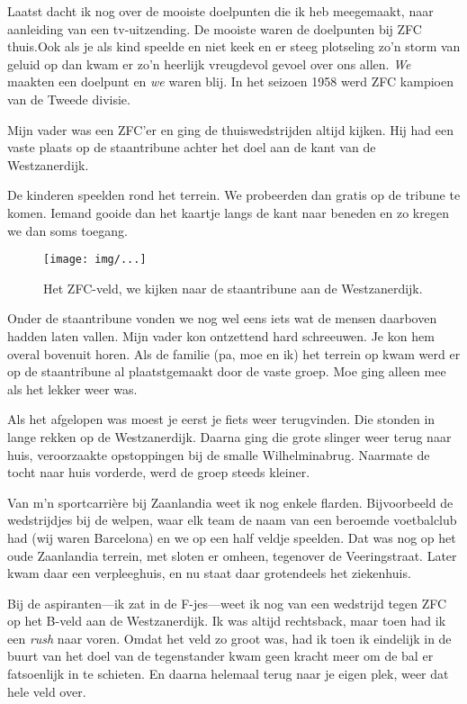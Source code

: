 \documentclass[10pt,twoside,openright]{memoir}
\begin{document}
Laatst dacht ik nog over de mooiste doelpunten die ik heb meegemaakt, naar aanleiding van een tv-uitzending. De mooiste waren de doelpunten bij ZFC thuis.Ook als je als kind speelde en niet keek en er steeg plotseling zo’n storm van geluid op dan kwam er zo’n heerlijk vreugdevol gevoel over ons allen. \emph{We} maakten een doelpunt en \emph{we} waren blij. In het seizoen 1958 werd ZFC kampioen van de Tweede divisie.

Mijn vader was een ZFC’er en ging de thuiswedstrijden altijd kijken. Hij had een vaste plaats op de staantribune achter het doel aan de kant van de Westzanerdijk. 

De kinderen speelden rond het terrein. We probeerden dan gratis op de tribune te komen. Iemand gooide dan het kaartje langs de kant naar beneden en zo kregen we dan soms toegang. 

\begin{figure}[t]
\texttt{[image: img/...]}
\caption{Het ZFC-veld, we kijken naar de staantribune aan de Westzanerdijk.}
\end{figure}

Onder de staantribune vonden we nog wel eens iets wat de mensen daarboven hadden laten vallen. Mijn vader kon ontzettend hard schreeuwen. Je kon hem overal bovenuit horen. Als de familie (pa, moe en ik) het terrein op kwam werd er op de staantribune al plaatstgemaakt door de vaste groep. Moe ging alleen mee als het lekker weer was. 

Als het afgelopen was moest je eerst je fiets weer terugvinden. Die stonden in lange rekken op de Westzanerdijk. Daarna ging die grote slinger weer terug naar huis, veroorzaakte opstoppingen bij de smalle Wilhelminabrug. Naarmate de tocht naar huis vorderde, werd de groep steeds kleiner. 

Van m’n sportcarrière bij Zaanlandia weet ik nog enkele flarden. Bijvoorbeeld de wedstrijdjes bij de welpen, waar elk team de naam van een beroemde voetbalclub had (wij waren Barcelona) en we op een half veldje speelden. Dat was nog op het oude Zaanlandia terrein, met sloten er omheen, tegenover de Veeringstraat. Later kwam daar een verpleeghuis, en nu staat daar grotendeels het ziekenhuis.

Bij de aspiranten---ik zat in de F-jes---weet ik nog van een wedstrijd tegen ZFC op het B-veld aan de Westzanerdijk. Ik was altijd rechtsback, maar toen had ik een \emph{rush} naar voren. Omdat het veld zo groot was, had ik toen ik eindelijk in de buurt van het doel van de tegenstander kwam geen kracht meer om de bal er fatsoenlijk in te schieten. En daarna helemaal terug naar je eigen plek, weer dat hele veld over. 
\end{document}
